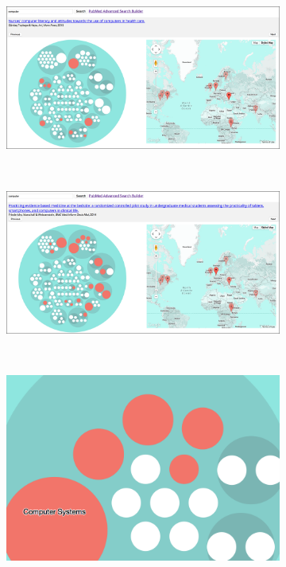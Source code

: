 \documentclass[Report.tex]{subfiles}
\begin{document}
\begin{figure}[!h]
\begin{center}
	\begin{subfigure}{0.8\textwidth}
		\includegraphics[width=\textwidth]{../lib/images/screen1}
	\end{subfigure}\\
	\par\bigskip
	\begin{subfigure}{0.8\textwidth}
		\includegraphics[width=\textwidth]{../lib/images/screen2}
	\end{subfigure}\\
\end{center}
	\begin{subfigure}{0.45\textwidth}
		\includegraphics[width=\textwidth]{../lib/images/screen3}

\end{subfigure}
\end{figure}
\end{document}
